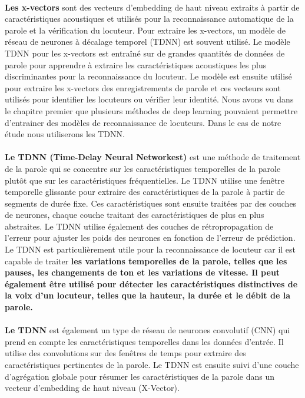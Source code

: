 \paragraph{}\textbf{Les x-vectors} sont des vecteurs d'embedding de haut niveau extraits à partir de caractéristiques acoustiques et utilisés pour la reconnaissance automatique de la parole et la vérification du locuteur. Pour extraire les x-vectors, un modèle de réseau de neurones à décalage temporel (TDNN) est souvent utilisé.
Le modèle TDNN pour les x-vectors est entraîné sur de grandes quantités de données de parole pour apprendre à extraire les caractéristiques acoustiques les plus discriminantes pour la reconnaissance du locuteur. Le modèle est ensuite utilisé pour extraire les x-vectors des enregistrements de parole et ces vecteurs sont utilisés pour identifier les locuteurs ou vérifier leur identité.
Nous avons vu dans le chapitre premier que plusieurs méthodes de deep learning pouvaient permettre d’entrainer des modèles de reconnaissance de locuteurs.  Dans le cas de notre étude nous utiliserons les TDNN.
\paragraph{}\textbf{Le TDNN (Time-Delay Neural Networkest)} est une méthode de traitement de la parole qui se concentre sur les caractéristiques temporelles de la parole plutôt que sur les caractéristiques fréquentielles.
Le TDNN utilise une fenêtre temporelle glissante pour extraire des caractéristiques de la parole à partir de segments de durée fixe. Ces caractéristiques sont ensuite traitées par des couches de neurones, chaque couche traitant des caractéristiques de plus en plus abstraites. Le TDNN utilise également des couches de rétropropagation de l'erreur pour ajuster les poids des neurones en fonction de l'erreur de prédiction.
Le TDNN est particulièrement utile pour la reconnaissance de locuteur car il est capable de traiter \textbf{les variations temporelles de la parole, telles que les pauses, les changements de ton et les variations de vitesse. Il peut également être utilisé pour détecter les caractéristiques distinctives de la voix d'un locuteur, telles que la hauteur, la durée et le débit de la parole.}
\paragraph{}\textbf{Le TDNN} est également un type de réseau de neurones convolutif (CNN) qui prend en compte les caractéristiques temporelles dans les données d'entrée. Il utilise des convolutions sur des fenêtres de temps pour extraire des caractéristiques pertinentes de la parole. Le TDNN est ensuite suivi d'une couche d'agrégation globale pour résumer les caractéristiques de la parole dans un vecteur d'embedding de haut niveau (X-Vector).

